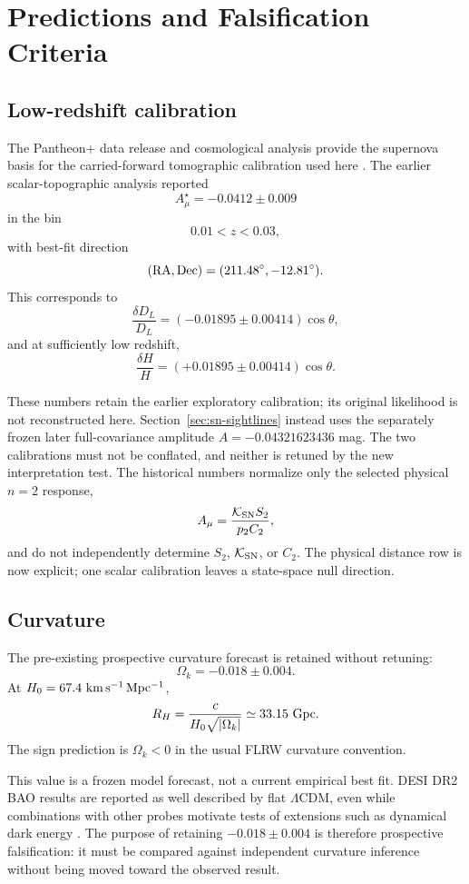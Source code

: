 
\section{Predictions and Falsification Criteria}

\subsection{Low-redshift calibration}

The Pantheon+ data release and cosmological analysis provide the supernova basis for the carried-forward tomographic calibration used here \citep{Scolnic2022,Brout2022}. The earlier scalar-topographic analysis reported
\[
A_\mu^\star=-0.0412\pm0.009
\]
in the bin
\[
0.01<z<0.03,
\]
with best-fit direction
\[
({\rm RA},{\rm Dec})
=
(211.48^\circ,-12.81^\circ).
\]
This corresponds to
\[
\frac{\delta D_L}{D_L}
=
(-0.01895\pm0.00414)\cos\theta,
\]
and at sufficiently low redshift,
\[
\frac{\delta H}{H}
=
(+0.01895\pm0.00414)\cos\theta.
\]

These numbers retain the earlier exploratory calibration; its original
likelihood is not reconstructed here. Section~\ref{sec:sn-sightlines} instead
uses the separately frozen later full-covariance amplitude
$A=-0.04321623436$ mag. The two calibrations must not be conflated, and
neither is retuned by the new interpretation test. The historical numbers
normalize only the selected physical \(n=2\) response,
\[
A_\mu
=
\frac{\mathcal K_{\rm SN}S_2}{p_2C_2},
\]
and do not independently determine \(S_2\), \(\mathcal K_{\rm SN}\), or \(C_2\). The physical distance row is now explicit; one scalar calibration leaves a state-space null direction.

\subsection{Curvature}

The pre-existing prospective curvature forecast is retained without retuning:
\[
\boxed{\Omega_k=-0.018\pm0.004}.
\]
At \(H_0=67.4\ {\rm km\,s^{-1}\,Mpc^{-1}}\),
\[
R_H
=
\frac{c}{H_0\sqrt{|\Omega_k|}}
\simeq33.15\ {\rm Gpc}.
\]
The sign prediction is \(\Omega_k<0\) in the usual FLRW curvature convention.

This value is a frozen model forecast, not a current empirical best fit. DESI DR2 BAO results are reported as well described by flat \(\Lambda\)CDM, even while combinations with other probes motivate tests of extensions such as dynamical dark energy \citep{DESIDR2ResultsII2025}. The purpose of retaining \(-0.018\pm0.004\) is therefore prospective falsification: it must be compared against independent curvature inference without being moved toward the observed result.

